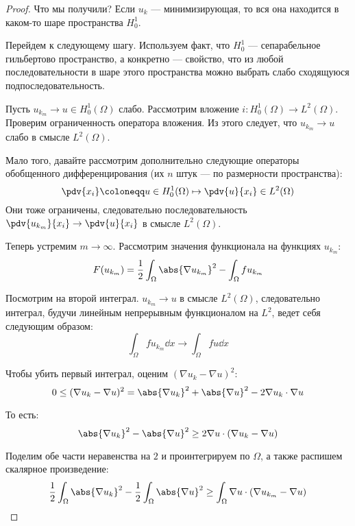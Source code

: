 \begin{proof}
  Что мы получили? Если $u_k$ --- минимизирующая, то вся она находится в каком-то шаре пространства $H_0^1$.
  
  Перейдем к следующему шагу. Используем факт, что $H_0^1$ --- сепарабельное гильбертово пространство, а конкретно --- свойство, что из любой последовательности в шаре этого пространства можно выбрать слабо сходящуюся подпоследовательность.
  
  Пусть $u_{k_m} \to u \in H_0^1(\Omega)$ слабо. Рассмотрим вложение $i \colon H_0^1(\Omega) \to L^2(\Omega)$. Проверим ограниченность оператора вложения.  Из этого следует, что $u_{k_m} \to u$ слабо в смысле $L^2(\Omega)$.
  
  Мало того, давайте рассмотрим дополнительно следующие операторы обобщенного дифференцирования (их $n$ штук --- по размерности пространства):
  \begin{equation}
    \pdv{x_i} \coloneqq u \in H_0^1(\Omega) \mapsto \pdv{u}{x_i} \in L^2(\Omega)
  \end{equation}
  Они тоже ограничены, следовательно последовательность $\pdv{u_{k_m}}{x_i} \to \pdv{u}{x_i}$ в смысле $L^2(\Omega)$.
  
  Теперь устремим $m \to \infty$. Рассмотрим значения функционала на функциях $u_{k_m}$:
  \begin{equation}
    F(u_{k_m}) = \frac{1}{2} \int_\Omega \abs{\nabla u_{k_m}}^2 - \int_{\Omega} f u_{k_m}
  \end{equation}
  
  Посмотрим на второй интеграл. $u_{k_m} \to u$ в смысле $L^2(\Omega)$, следовательно интеграл, будучи линейным непрерывным функционалом на $L^2$, ведет себя следующим образом:
  \begin{equation}
    \int_\Omega f u_{k_m} \dd x \to \int_{\Omega} fu \dd x
  \end{equation}
  
  Чтобы убить первый интеграл, оценим $(\nabla u_k - \nabla u)^2$:
  \begin{equation}
    0 \le (\nabla u_k - \nabla u)^2 = \abs{\nabla u_k}^2 + \abs{\nabla u}^2 - 2 \nabla u_k \cdot \nabla u
  \end{equation}
  
  То есть:
  \begin{equation}
    \abs{\nabla u_k}^2 - \abs{\nabla u}^2 \ge 2 \nabla u \cdot (\nabla u_k - \nabla u)
  \end{equation}
  
  Поделим обе части неравенства на $2$ и проинтегрируем по $\Omega$, а также распишем скалярное произведение:
  \begin{equation}
    \frac{1}{2} \int_\Omega \abs{\nabla u_k}^2 - \frac{1}{2} \int_\Omega \abs{\nabla u}^2 \ge \int_\Omega \nabla u \cdot (\nabla u_{k_m} - \nabla u)
  \end{equation}
  

\end{proof}
